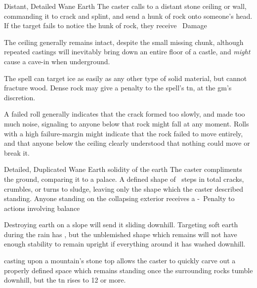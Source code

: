 \ifodd\value{diceNo}

  {Distant, Detailed}%
  {Wane}%
  {Earth}%
  {}%
  {The caster calls to a distant stone ceiling or wall, commanding it to crack and splint, and send a hunk of rock onto someone's head.
    If the target fails to notice the hunk of rock, they receive \showDam\ Damage}%
  {
    The ceiling generally remains intact, despite the small missing chunk, although repeated castings will inevitably bring down an entire floor of a castle, and \emph{might} cause a cave-in when underground.

    The spell can target ice as easily as any other type of solid material, but cannot fracture wood.
    Dense rock may give a penalty to the spell's \gls{tn}, at the \gls{gm}'s discretion.

    A failed roll generally indicates that the crack formed too slowly, and made too much noise, signaling to anyone below that rock might fall at any moment.
    Rolls with a high failure-margin might indicate that the rock failed to move entirely, and that anyone below the ceiling clearly understood that nothing could move or break it.
  }

\else

  {Detailed, Duplicated}%
  {Wane}%
  {Earth}%
  {solidity of the earth}%
  {The caster compliments the ground, comparing it to a palace.
  A defined shape of ~\glspl{step} in total cracks, crumbles, or turns to sludge, leaving only the shape which the caster described standing.
  Anyone standing on the collapsing exterior receives a -~Penalty to \glspl{action} involving balance}%
  {
	Destroying earth on a slope will send it sliding downhill.
    Targeting soft earth during the rain has \tn[7], but the unblemished shape which remains will not have enough stability to remain upright if everything around it has washed downhill.

    \Gls{casting} upon a mountain's stone top allows the caster to quickly carve out a properly defined space which remains standing once the surrounding rocks tumble downhill, but the \gls{tn} rises to 12 or more.
  }

\fi
{}
